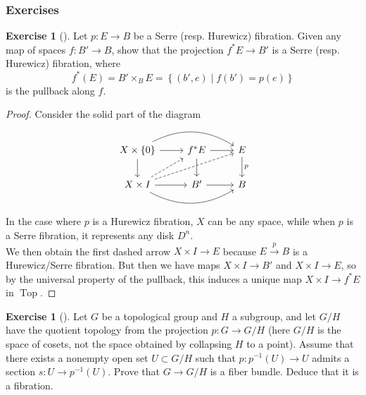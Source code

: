 \documentclass[reqno]{amsart}
\theoremstyle{definition}
\newtheorem{exercise}[theorem]{Exercise}
\theoremstyle{remark}
\DeclareMathOperator{\Top}{Top}
\begin{document}
\subsubsection{Exercises}

\begin{exercise}[]
    Let $p \colon E \to B$ be a Serre (resp. Hurewicz) fibration.
    Given any map of spaces $f \colon B' \to B$, show that
    the projection $f^{*}E \to B'$ is a Serre (resp. Hurewicz)
    fibration, where
     \[
     f^{*}(E) = B' \times_B E
     = \left\{ \left( b', e \right)  \mid 
     f(b') = p(e) \right\} 
     \] 
     is the pullback along $f$.
\end{exercise}

\begin{proof}
    Consider the solid part of the diagram
    \begin{equation*}
    \begin{tikzcd}
        X \times \left\{ 0 \right\} \ar[d] \ar[r] 
        \ar[rr, bend left] & f^{*}E \ar[d] \ar[r] & E 
        \ar[d, "p"]\\
        X \times I \ar[r] \ar[rr, bend right]
        \ar[rru, dashed] \ar[ru, dashed]&
        B' \ar[r] & B
    \end{tikzcd}
    \end{equation*}
    In the case where $p$ is a Hurewicz fibration,
    $X$ can be any space, while when $p$ is a Serre
    fibration, it represents any disk $D^{n}$.\\
    We then obtain the first dashed
    arrow $X \times I \to E$ because
    $E \stackrel{p}{\to} B$ is a Hurewicz/Serre fibration.
    But then we have maps
    $X \times I \to B'$ and
    $X \times I \to E$, so by the universal property
    of the pullback, this induces a unique map
    $X \times I \to f^{*} E$ in $\Top$.
\end{proof}

\begin{exercise}[]
    Let $G$ be a topological group and $H$ a subgroup,
    and let $G / H$ have the quotient topology from
    the projection $p \colon G \to G / H$ (here
    $G / H$ is the space of cosets, not the space obtained
    by collapsing $H$ to a point).
    Assume that there exists a nonempty open set
    $U \subset G / H$ such that 
    $p \colon p^{-1}(U) \to U$ admits
    a section $s \colon U \to p^{-1}(U)$. Prove that
    $G \to G / H$ is a fiber bundle. Deduce that
    it is a fibration.
\end{exercise}
\end{document}
